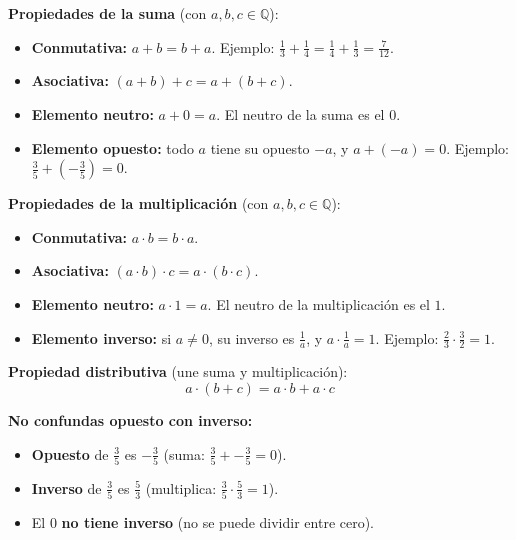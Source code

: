 \documentclass[12pt, letterpaper]{article}
\newcommand{\Q}{\mathbb{Q}}
\begin{document}
\begin{cuadroteoria}
  \textbf{Propiedades de la suma} (con $a, b, c \in \Q$):
  \begin{itemize}[leftmargin=*]
    \item \textbf{Conmutativa:} $a + b = b + a$. \quad Ejemplo: $\frac{1}{3} + \frac{1}{4} = \frac{1}{4} + \frac{1}{3} = \frac{7}{12}$.
    \item \textbf{Asociativa:} $(a + b) + c = a + (b + c)$.
    \item \textbf{Elemento neutro:} $a + 0 = a$. El neutro de la suma es el $0$.
    \item \textbf{Elemento opuesto:} todo $a$ tiene su opuesto $-a$, y $a + (-a) = 0$. \quad Ejemplo: $\frac{3}{5} + \left(-\frac{3}{5}\right) = 0$.
  \end{itemize}
\end{cuadroteoria}

\begin{cuadroteoria}
  \textbf{Propiedades de la multiplicación} (con $a, b, c \in \Q$):
  \begin{itemize}[leftmargin=*]
    \item \textbf{Conmutativa:} $a \cdot b = b \cdot a$.
    \item \textbf{Asociativa:} $(a \cdot b) \cdot c = a \cdot (b \cdot c)$.
    \item \textbf{Elemento neutro:} $a \cdot 1 = a$. El neutro de la multiplicación es el $1$.
    \item \textbf{Elemento inverso:} si $a \neq 0$, su inverso es $\frac{1}{a}$, y $a \cdot \frac{1}{a} = 1$. \quad Ejemplo: $\frac{2}{3} \cdot \frac{3}{2} = 1$.
  \end{itemize}

  \textbf{Propiedad distributiva} (une suma y multiplicación):
  \[
    a \cdot (b + c) = a \cdot b + a \cdot c
  \]
\end{cuadroteoria}

\begin{cuadroadvertencia}
  \textbf{No confundas opuesto con inverso:}
  \begin{itemize}[leftmargin=*]
    \item \textbf{Opuesto} de $\frac{3}{5}$ es $-\frac{3}{5}$ \quad (suma: $\frac{3}{5} + -\frac{3}{5} = 0$).
    \item \textbf{Inverso} de $\frac{3}{5}$ es $\frac{5}{3}$ \quad (multiplica: $\frac{3}{5} \cdot \frac{5}{3} = 1$).
    \item El $0$ \textbf{no tiene inverso} (no se puede dividir entre cero).
  \end{itemize}
\end{cuadroadvertencia}
\end{document}
